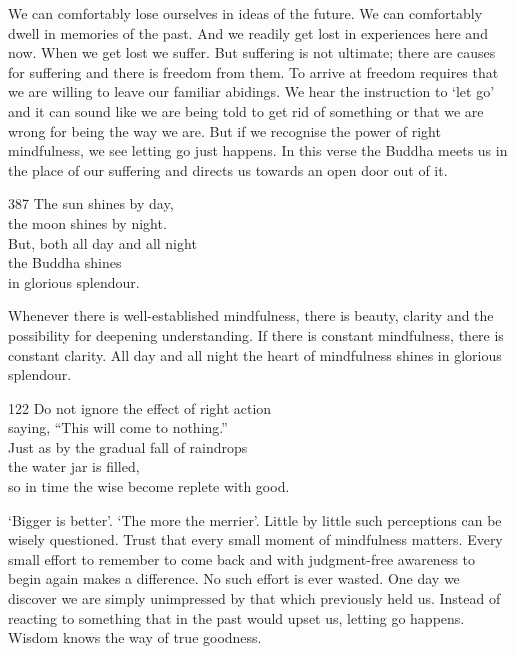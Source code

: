 \begin{dhpRefl}

We can comfortably lose ourselves in ideas of the future. We can
comfortably dwell in memories of the past. And we readily get lost in
experiences here and now. When we get lost we suffer. But suffering
is not ultimate; there are causes for suffering and there is freedom
from them. To arrive at freedom requires that we are willing to leave
our familiar abidings. We hear the instruction to `let go' and it can
sound like we are being told to get rid of something or that we are
wrong for being the way we are. But if we recognise the power of
right mindfulness, we see letting go just happens. In this verse the
Buddha meets us in the place of our suffering and directs us towards
an open door out of it.

\end{dhpRefl}


\begin{dhpVerse}{387}
\label{dhp-387}
The sun shines by day,\\
the moon shines by night.\\
But, both all day and all night\\
the Buddha shines\\
in glorious splendour.
\end{dhpVerse}

\begin{dhpRefl}

Whenever there is well-established mindfulness, there is beauty,
clarity and the possibility for deepening understanding. If there is
constant mindfulness, there is constant clarity. All day and all
night the heart of mindfulness shines in glorious splendour.

\end{dhpRefl}


\begin{dhpVerse}{122}
\label{dhp-122}
Do not ignore the effect of right action\\
saying, ``This will come to nothing.''\\
Just as by the gradual fall of raindrops\\
the water jar is filled,\\
so in time the wise become replete with good.
\end{dhpVerse}

\begin{dhpRefl}

`Bigger is better'. `The more the merrier'. Little by little such
perceptions can be wisely questioned. Trust that every small moment
of mindfulness matters. Every small effort to remember to come back
and with judgment-free awareness to begin again makes a difference.
No such effort is ever wasted. One day we discover we are simply
unimpressed by that which previously held us. Instead of reacting to
something that in the past would upset us, letting go happens. Wisdom
knows the way of true goodness.

\end{dhpRefl}

